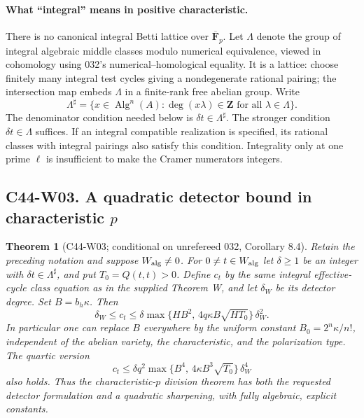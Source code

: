 \documentclass[11pt]{article}
\newtheorem{theorem}{Theorem}[section]
\theoremstyle{remark}\newtheorem{remark}[theorem]{Remark}
\begin{document}
\paragraph{What ``integral'' means in positive characteristic.}
There is no canonical integral Betti lattice over $\overline{\mathbf F}_p$.
Let $\Lambda$ denote the group of integral algebraic middle classes
modulo numerical equivalence, viewed in cohomology using 032's
numerical--homological equality.  It is a lattice: choose finitely
many integral test cycles giving a nondegenerate rational pairing;
the intersection map embeds $\Lambda$ in a finite-rank free abelian
group.  Write
\[
 \Lambda^\sharp=\{x\in\operatorname{Alg}^n(A):\deg(x\lambda)\in\mathbf Z
                       \text{ for all }\lambda\in\Lambda\}.
\]
The denominator condition needed below is $\delta t\in\Lambda^\sharp$.
The stronger condition $\delta t\in\Lambda$ suffices.  If an integral
compatible realization is specified, its rational classes with integral
pairings also satisfy this condition.  Integrality only at one prime
$\ell$ is insufficient to make the Cramer numerators integers.

\subsection*{C44-W03. A quadratic detector bound in characteristic $p$}

\begin{theorem}[C44-W03; conditional on unrefereed 032, Corollary 8.4]
Retain the preceding notation and suppose $W_{\rm alg}\ne0$.
For $0\ne t\in W_{\rm alg}$ let $\delta\geq1$ be an integer with
$\delta t\in\Lambda^\sharp$, and put $T_0=Q(t,t)>0$.
Define $c_t$ by the same integral effective-cycle class equation as
in the supplied Theorem W, and let $\delta_W$ be its detector degree.
Set $B=b_h\kappa$.  Then
\begin{equation}\label{c44:weil-quadratic}
 \delta_W\leq c_t\leq
 \delta\max\{HB^2,\,4q\kappa B\sqrt{HT_0}\}\,\delta_W^2.
\end{equation}
In particular one can replace $B$ everywhere by the uniform constant
$B_0=2^n\kappa/n!$, independent of the abelian variety, the
characteristic, and the polarization type.  The quartic version
\begin{equation}\label{c44:weil-quartic}
 c_t\leq\delta q^2\max\{B^4,\,4\kappa B^3\sqrt{T_0}\}\,\delta_W^4
\end{equation}
also holds.  Thus the characteristic-$p$ division theorem has both
the requested detector formulation and a quadratic sharpening,
with fully algebraic, explicit constants.
\end{theorem}
\end{document}
